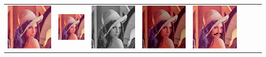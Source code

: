 \documentclass{beamer}
\begin{document}
\begin{frame}
\begin{tabular}{cccccccc}
    \includegraphics[height=.3in,width=.3in,keepaspectratio]{../images/60.png} &
    \includegraphics[height=.3in,width=.3in,keepaspectratio]{../images/61.jpg} &
    \includegraphics[height=.3in,width=.3in,keepaspectratio]{../images/62.jpg} &
    \includegraphics[height=.3in,width=.3in,keepaspectratio]{../images/63.jpg} &
    \includegraphics[height=.3in,width=.3in,keepaspectratio]{../images/64.jpg}
  \end{tabular}

\end{frame}
\end{document}
